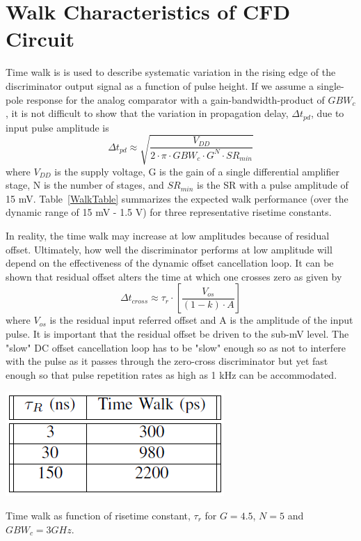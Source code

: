 \documentclass[12pt,oneside,final]{siuethesis}
\theoremstyle{definition}
\begin{document}
\section{Walk Characteristics of CFD Circuit}
\par Time walk is is used to describe systematic variation in the rising edge of the discriminator output signal as a function of pulse height.  If we assume a single-pole response for the analog comparator with a gain-bandwidth-product of $GBW_c$, it is not difficult to show that the variation in propagation delay, $\Delta t_{pd}$, due to input pulse amplitude is 
\begin{equation}
\Delta t_{pd} \approx  \sqrt{\frac{V_{DD}}{2 \cdot \pi \cdot GBW_c \cdot G^N \cdot SR_{min}}}
\end{equation}
where $V_{DD}$ is the supply voltage, G is the gain of a single differential amplifier stage, N is the number of stages, and $SR_{min}$ is  the SR with a pulse amplitude of 15 mV.   Table~\ref{WalkTable} summarizes the expected walk performance (over the dynamic range of 15 mV - 1.5 V) for three representative risetime constants.
\par In reality, the time walk may increase at low amplitudes because of residual offset.  Ultimately, how well the discriminator performs at low amplitude will depend on the effectiveness of the dynamic offset cancellation loop. It can be shown that residual offset alters the time at which one crosses zero as given by
\begin{equation}
\Delta t_{cross} \approx \tau_r \cdot \left[ \frac{V_{os}}{(1-k) \cdot A} \right]
\end{equation}
where $V_{os}$ is the residual input referred offset and A is the amplitude of the input pulse. It is important that the residual offset be driven to the sub-mV level.  The "slow" DC offset cancellation loop has to be "slow" enough so as not to interfere with the pulse as it passes through the zero-cross discriminator but yet fast enough so that pulse repetition rates as high as 1 kHz can be accommodated. 

\begin{table}[htbp!]
 \centering
 \includegraphics[scale=.7,keepaspectratio=true]{./ch4_figures/walk_table.png}
\caption{Time walk as function of risetime constant, $\tau_r$ for $G = 4.5$, $N = 5$ and $GBW_{c} = 3 GHz$.}
\label{WalkTable}
\end{table}
\end{document}
